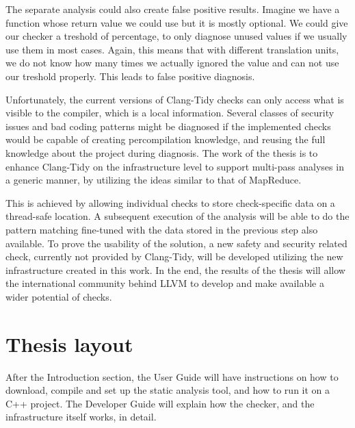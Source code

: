 \par The separate analysis could also create false positive results. Imagine we have a function whose return value we could use but it is mostly
optional. We could give our checker a treshold of percentage, to only diagnose unused values if we usually use them in most cases. Again, this
means that with different translation units, we do not know how many times we actually ignored the value and can not use our treshold properly.
This leads to false positive diagnosis.

\par Unfortunately, the current versions of Clang-Tidy checks can only access what is visible to the compiler, which is a local information.
Several classes of security issues and bad coding patterns might be diagnosed if the implemented checks would be capable of creating 
percompilation knowledge, and reusing the full knowledge about the project during diagnosis.
The work of the thesis is to enhance Clang-Tidy on the infrastructure level to support multi-pass analyses in a generic manner, by 
utilizing the ideas similar to that of MapReduce.
\par This is achieved by allowing individual checks to store check-specific data on a thread-safe location.
A subsequent execution of the analysis will be able to do the pattern matching fine-tuned with the data stored in the previous step also
available.
To prove the usability of the solution, a new safety and security related check, currently not provided by Clang-Tidy, will be developed
utilizing the new infrastructure created in this work.
In the end, the results of the thesis will allow the international community behind LLVM to develop and make available a wider potential of
checks.

\section{Thesis layout}

After the Introduction section, the User Guide will have instructions on how to download, compile and set up the static analysis tool, and
how to run it on a C++ project. The Developer Guide will explain how the checker, and the infrastructure itself works, in detail.
